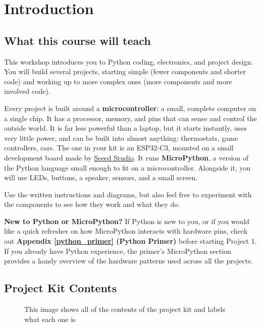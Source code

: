 \chapter{Introduction}
\section{What this course will teach}
This workshop introduces you to Python coding, electronics, and project design. You will
build several projects, starting simple (fewer components and shorter code) and working up
to more complex ones (more components and more involved code).

Every project is built around a \textbf{microcontroller}: a small, complete computer on a
single chip. It has a processor, memory, and pins that can sense and control the outside
world. It is far less powerful than a laptop, but it starts instantly, uses very little
power, and can be built into almost anything: thermostats, game controllers, cars. The one
in your kit is an ESP32-C3, mounted on a small development board made by
\href{https://www.seeedstudio.com/Seeed-XIAO-ESP32C3-p-5431.html}{Seeed Studio}. It runs
\textbf{MicroPython}, a version of the Python language small enough to fit on a
microcontroller. Alongside it, you will use LEDs, buttons, a speaker, sensors, and a small
screen.

Use the written instructions and diagrams, but also feel free to experiment with the
components to see how they work and what they do.

\begin{tcolorbox}[colback=blue!5!white,colframe=blue!40!black]
    \textbf{New to Python or MicroPython?}
    If Python is new to you, or if you would like a quick refresher on how MicroPython interacts
    with hardware pins, check out \textbf{Appendix \ref{python_primer} (Python Primer)} before starting
    Project 1. If you already have Python experience, the primer's MicroPython section provides a
    handy overview of the hardware patterns used across all the projects.
\end{tcolorbox}

\section{Project Kit Contents}
\begin{figure}[H]
\centering
    \caption{This image shows all of the contents of the project kit and labels what each one is}
\end{figure}

